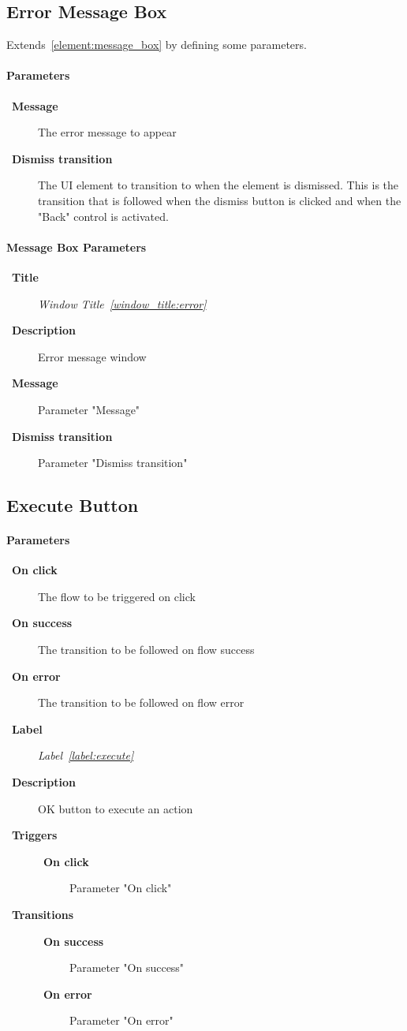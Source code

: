 \documentclass[a4paper,10pt]{article}
\newcommand{\windowTitleLabelText}{Window Title}
\newcommand{\windowTitleLabel}{window_title:}
\DeclareRobustCommand{\windowTitleRef}[1]{%
   \emph{\windowTitleLabelText~\ref{\windowTitleLabel#1}}}
\newcommand{\labelLabelText}{Label}
\newcommand{\labelLabel}{label:}
\DeclareRobustCommand{\labelRef}[1]{%
   \emph{\labelLabelText~\ref{\labelLabel#1}}}
\newcommand{\elementLabel}{element:}
\DeclareRobustCommand{\element}[2]{\subsection{#1}\label{\elementLabel#2}}
\DeclareRobustCommand{\elementRef}[1]{\ref{\elementLabel#1}}
\let\Item\item
\newcommand\SpecialItem{\renewcommand\item[1][]{\Item[\textbullet~\bfseries##1]}
}
\begin{document}
\element{Error Message Box}{error_message_box}
Extends~\elementRef{message_box} by defining some parameters.

\paragraph{Parameters}
\SpecialItem
\begin{description}
 \item[Message] The error message to appear
 \item[Dismiss transition] The UI element to transition to when the element is 
dismissed. This is the transition that is followed when the dismiss button is 
clicked and when the "Back" control is activated.
\end{description}

\paragraph{Message Box Parameters}
\SpecialItem
\begin{description}
 \item[Title] \windowTitleRef{error}
 \item[Description] Error message window
 \item[Message] Parameter "Message"
 \item[Dismiss transition] Parameter "Dismiss transition"
\end{description}

\element{Execute Button}{execute_button}

\paragraph{Parameters}
\SpecialItem
\begin{description}
 \item[On click] The flow to be triggered on click
 \item[On success] The transition to be followed on flow success
 \item[On error] The transition to be followed on flow error
\end{description}

\begin{description}
 \item[Label] \labelRef{execute}
 \item[Description] OK button to execute an action
 \item[Triggers]\mbox{}
 \begin{description}
  \item[On click] Parameter "On click"
 \end{description}
 \item[Transitions]\mbox{}
 \begin{description}
  \item[On success] Parameter "On success"
  \item[On error] Parameter "On error"
 \end{description}
\end{description}
\end{document}
